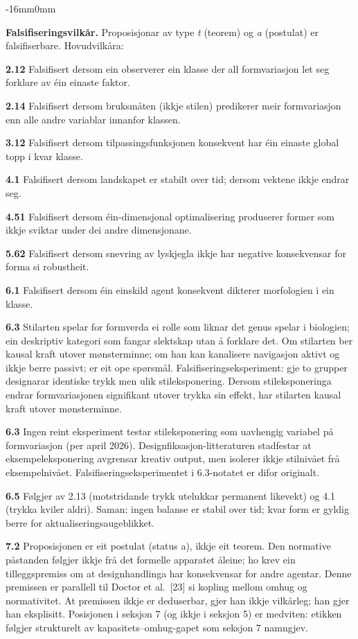 \documentclass[10pt,oneside]{book}
\newenvironment{widebody}{%
  \begin{adjustwidth}{-16mm}{0mm}%
}{%
  \end{adjustwidth}%
}
\begin{document}
\begin{widebody}
{\bigskip
\textbf{Falsifiseringsvilkår.} Proposisjonar av type \textit{t} (teorem) og \textit{a} (postulat) er falsifiserbare. Hovudvilkåra:

\textbf{2.12} Falsifisert dersom ein observerer ein klasse der all formvariasjon let seg forklare av éin einaste faktor.

\textbf{2.14} Falsifisert dersom bruksmåten (ikkje stilen) predikerer meir formvariasjon enn alle andre variablar innanfor klassen.

\textbf{3.12} Falsifisert dersom tilpassingsfunksjonen konsekvent har éin einaste global topp i kvar klasse.

\textbf{4.1} Falsifisert dersom landskapet er stabilt over tid; dersom vektene ikkje endrar seg.

\textbf{4.51} Falsifisert dersom éin-dimensjonal optimalisering produserer former som ikkje sviktar under dei andre dimensjonane.

\textbf{5.62} Falsifisert dersom snevring av lyskjegla ikkje har negative konsekvensar for forma si robustheit.

\textbf{6.1} Falsifisert dersom éin einskild agent konsekvent dikterer morfologien i ein klasse.

\textbf{6.3} Stilarten spelar for formverda ei rolle som liknar det genus spelar i biologien; ein deskriptiv kategori som fangar slektskap utan å forklare det. Om stilarten ber kausal kraft utover mønsterminne; om han kan kanalisere navigasjon aktivt og ikkje berre passivt; er eit ope spørsmål. Falsifiseringseksperiment: gje to grupper designarar identiske trykk men ulik stileksponering. Dersom stileksponeringa endrar formvariasjonen signifikant utover trykka sin effekt, har stilarten kausal kraft utover mønsterminne.

\textbf{6.3} Ingen reint eksperiment testar stileksponering som uavhengig variabel på formvariasjon (per april 2026). Designfiksasjon-litteraturen stadfestar at eksempeleksponering avgrensar kreativ output, men isolerer ikkje stilnivået frå eksempelnivået. Falsifiseringseksperimentet i 6.3-notatet er difor originalt.

\textbf{6.5} Følgjer av 2.13 (motstridande trykk utelukkar permanent likevekt) og 4.1 (trykka kviler aldri). Saman: ingen balanse er stabil over tid; kvar form er gyldig berre for aktualiseringsaugeblikket.

\textbf{7.2} Proposisjonen er eit postulat (status a), ikkje eit teorem. Den normative påstanden følgjer ikkje frå det formelle apparatet åleine; ho krev ein tilleggspremiss om at designhandlinga har konsekvensar for andre agentar. Denne premissen er parallell til Doctor et al.\ [23] si kopling mellom omhug og normativitet. At premissen ikkje er deduserbar, gjer han ikkje vilkårleg; han gjer han eksplisitt. Posisjonen i seksjon 7 (og ikkje i seksjon 5) er medviten: etikken følgjer strukturelt av kapasitets--omhug-gapet som seksjon 7 namngjev.

}
\end{widebody}
\end{document}
